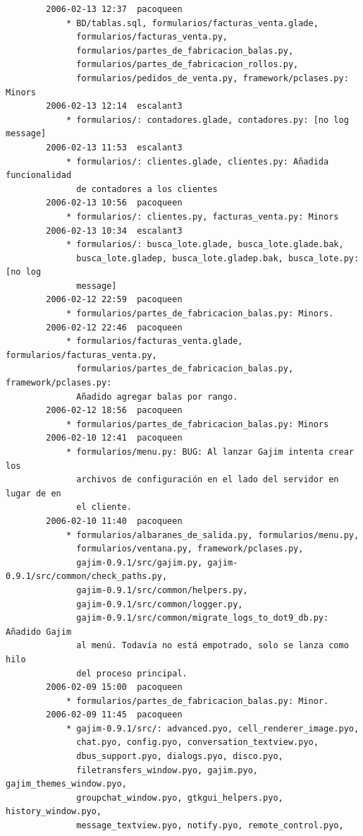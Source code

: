 \documentclass[a4paper]{article}
\begin{document}
\begin{verbatim}
        2006-02-13 12:37  pacoqueen
            * BD/tablas.sql, formularios/facturas_venta.glade,
              formularios/facturas_venta.py,
              formularios/partes_de_fabricacion_balas.py,
              formularios/partes_de_fabricacion_rollos.py,
              formularios/pedidos_de_venta.py, framework/pclases.py: Minors
        2006-02-13 12:14  escalant3
            * formularios/: contadores.glade, contadores.py: [no log message]
        2006-02-13 11:53  escalant3
            * formularios/: clientes.glade, clientes.py: Añadida funcionalidad
              de contadores a los clientes
        2006-02-13 10:56  pacoqueen
            * formularios/: clientes.py, facturas_venta.py: Minors
        2006-02-13 10:34  escalant3
            * formularios/: busca_lote.glade, busca_lote.glade.bak,
              busca_lote.gladep, busca_lote.gladep.bak, busca_lote.py: [no log
              message]
        2006-02-12 22:59  pacoqueen
            * formularios/partes_de_fabricacion_balas.py: Minors.
        2006-02-12 22:46  pacoqueen
            * formularios/facturas_venta.glade, formularios/facturas_venta.py,
              formularios/partes_de_fabricacion_balas.py, framework/pclases.py:
              Añadido agregar balas por rango.
        2006-02-12 18:56  pacoqueen
            * formularios/partes_de_fabricacion_balas.py: Minors
        2006-02-10 12:41  pacoqueen
            * formularios/menu.py: BUG: Al lanzar Gajim intenta crear los
              archivos de configuración en el lado del servidor en lugar de en
              el cliente.
        2006-02-10 11:40  pacoqueen
            * formularios/albaranes_de_salida.py, formularios/menu.py,
              formularios/ventana.py, framework/pclases.py,
              gajim-0.9.1/src/gajim.py, gajim-0.9.1/src/common/check_paths.py,
              gajim-0.9.1/src/common/helpers.py,
              gajim-0.9.1/src/common/logger.py,
              gajim-0.9.1/src/common/migrate_logs_to_dot9_db.py: Añadido Gajim
              al menú. Todavía no está empotrado, solo se lanza como hilo
              del proceso principal.
        2006-02-09 15:00  pacoqueen
            * formularios/partes_de_fabricacion_balas.py: Minor.
        2006-02-09 11:45  pacoqueen
            * gajim-0.9.1/src/: advanced.pyo, cell_renderer_image.pyo,
              chat.pyo, config.pyo, conversation_textview.pyo,
              dbus_support.pyo, dialogs.pyo, disco.pyo,
              filetransfers_window.pyo, gajim.pyo, gajim_themes_window.pyo,
              groupchat_window.pyo, gtkgui_helpers.pyo, history_window.pyo,
              message_textview.pyo, notify.pyo, remote_control.pyo,

\end{verbatim}
\end{document}
